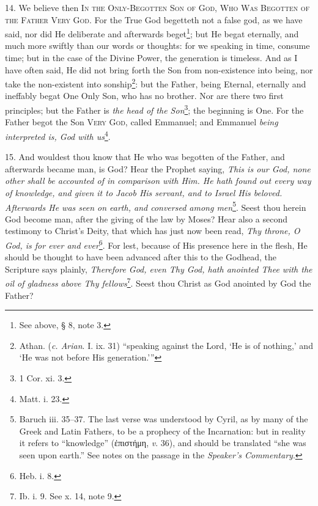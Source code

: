 14. We believe then \textsc{In the Only-Begotten Son of God, Who Was Begotten of the Father Very God}. For the True God begetteth not a false god, as we have said, nor did He deliberate and afterwards beget\footnote{See above, § 8, note 3.}; but He begat eternally, and much more swiftly than our words or thoughts: for we speaking in time, consume time; but in the case of the Divine Power, the generation is timeless. And as I have often said, He did not bring forth the Son from non-existence into being, nor take the non-existent into sonship\footnote{Athan. (\emph{c. Arian}. I. ix. 31) “speaking against the Lord, ‘He is of nothing,’ and ‘He was not before His generation.’”}: but the Father, being Eternal, eternally and ineffably begat One Only Son, who has no brother. Nor are there two first principles; but the Father is \emph{the head of the Son}\footnote{1 Cor. xi. 3.}; the beginning is One. For the Father begot the Son \textsc{Very God}, called Emmanuel; and Emmanuel \emph{being interpreted is, God with us}\footnote{Matt. i. 23.}.

15. And wouldest thou know that He who was begotten of the Father, and afterwards became man, is God? Hear the Prophet saying, \emph{This is our God, none other shall be accounted of in comparison with Him. He hath found out every way of knowledge, and given it to Jacob His servant, and to Israel His beloved. Afterwards He was seen on earth, and conversed among men}\footnote{Baruch iii. 35–37. The last verse was understood by Cyril, as by many of the Greek and Latin Fathers, to be a prophecy of the Incarnation: but in reality it refers to “knowledge” (\textgreek{ἐπιστήμη}, \emph{v}. 36), and should be translated “she was seen upon earth.” See notes on the passage in the \emph{Speaker’s Commentary}.}. Seest thou herein God become man, after the giving of the law by Moses? Hear also a second testimony to Christ’s Deity, that which has just now been read, \emph{Thy throne, O God, is for ever and ever}\footnote{Heb. i. 8.}. For lest, because of His presence here in the flesh, He should be thought to have been advanced after this to the Godhead, the Scripture says plainly, \emph{Therefore God, even Thy God, hath anointed Thee with the oil of gladness above Thy fellows}\footnote{Ib. i. 9. See x. 14, note 9.}. Seest thou Christ as God anointed by God the Father?

